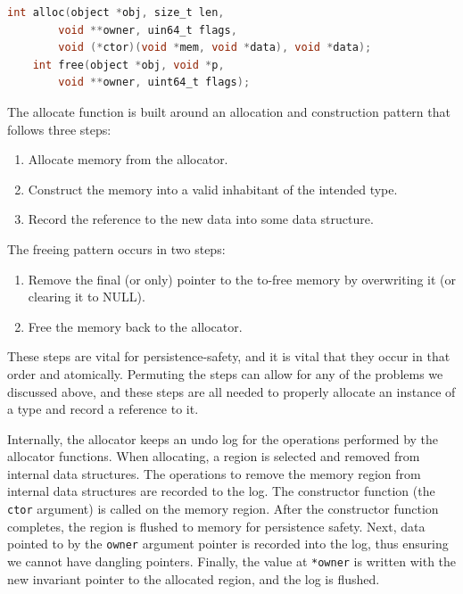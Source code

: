 \begin{lstlisting}[language=C]
    int alloc(object *obj, size_t len,
        void **owner, uin64_t flags,
        void (*ctor)(void *mem, void *data), void *data);
    int free(object *obj, void *p,
        void **owner, uint64_t flags);
\end{lstlisting}

The allocate function is built around an allocation and construction pattern that follows three steps:
\begin{enumerate}
    \item Allocate memory from the allocator.
    \item Construct the memory into a valid inhabitant of the intended type.
    \item Record the reference to the new data into some data structure.
\end{enumerate}

The freeing pattern occurs in two steps:

\begin{enumerate}
    \item Remove the final (or only) pointer to the to-free memory by overwriting it (or clearing it to NULL).
    \item Free the memory back to the allocator.
\end{enumerate}

These steps are vital for persistence-safety, and it is vital that they occur in that order and atomically. Permuting the steps can
allow for any of the problems we discussed above, and these steps are all needed to properly allocate an instance of
a type and record a reference to it.

Internally, the allocator keeps an undo log for the operations performed by the allocator functions. When allocating, a
region is selected and removed from internal data structures. The operations to remove the memory region from internal
data structures are recorded to the log. The constructor function (the \texttt{ctor} argument) is called on the memory region. After the constructor
function completes, the region is flushed to memory for persistence safety. Next, data pointed to by the \texttt{owner}
argument pointer is recorded into the log, thus ensuring we cannot have dangling pointers. Finally, the value at
\texttt{*owner} is written with the new invariant pointer to the allocated region, and the log is flushed.

